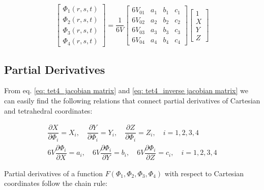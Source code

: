 \begin{equation} \label{eq: tet4_inverse jacobian matrix}
\begin{bmatrix}
\Phi_1(r,s,t)\\
\Phi_2(r,s,t)\\
\Phi_3(r,s,t)\\
\Phi_4(r,s,t)
\end{bmatrix} = \dfrac{1}{6V} \begin{bmatrix}
6V_{01} & a_1 & b_1 & c_1 \\
6V_{02} & a_2 & b_2 & c_2\\
6V_{03} & a_3 & b_3 & c_3\\
6V_{04} & a_4 & b_4 & c_4
\end{bmatrix} \begin{bmatrix}
1\\
X\\
Y\\
Z
\end{bmatrix}
\end{equation}

\subsection{Partial Derivatives}
From eq. \ref{eq: tet4_jacobian matrix} and \ref{eq: tet4_inverse jacobian matrix} we can easily find the following relations that connect partial derivatives of Cartesian and tetrahedral coordinates:

\begin{align*}
\dfrac{\partial X}{\partial \Phi_i} = X_i, \quad \dfrac{\partial Y}{\partial \Phi_i} = Y_i, \quad \dfrac{\partial Z}{\partial \Phi_i} = Z_i, \quad i=1,2,3,4\\
6V\dfrac{\partial \Phi_i}{\partial X} = a_i, \quad 6V\dfrac{\partial \Phi_i}{\partial Y} = b_i, \quad 6V\dfrac{\partial \Phi_i}{\partial Z} = c_i, \quad i=1,2,3,4
\end{align*}

Partial derivatives of a function $ F(\Phi_1, \Phi_2, \Phi_3, \Phi_4) $ with respect to Cartesian coordinates follow the chain rule:

